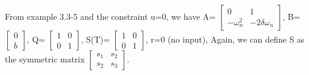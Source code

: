 \documentclass{article}
\begin{document}
  From example 3.3-5 and the constraint u=0, we have \newline
  A=
  $\begin{bmatrix}
	  0 & 1 \\
	  -\omega_n^2 & -2\delta\omega_n 
  \end{bmatrix}$, B=
  $\begin{bmatrix}
         0 \\
         b 
  \end{bmatrix}$, Q=
  $\begin{bmatrix}
	  1 & 0 \\
          0 & 1
  \end{bmatrix}$, S(T)=
  $\begin{bmatrix}
	  1 & 0 \\
	  0 & 1
  \end{bmatrix}$, r=0 (no input),  \newline
  Again, we can define S as the symmetric matrix
  $\begin{bmatrix}
	  s_1 & s_2 \\
          s_2 & s_3
  \end{bmatrix}$.
\end{document}

